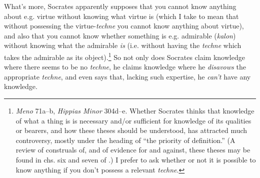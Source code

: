 ﻿\documentclass[11pt]{amsart}
\begin{document}
What's more, Socrates apparently supposes that you cannot know anything about e.g. virtue without knowing what virtue is (which I take to mean that without possessing the virtue-\emph{techne} you cannot know anything about virtue), and also that you cannot know whether something is e.g. admirable (\emph{kalon}) without knowing what the admirable \emph{is} (i.e. without having the \emph{techne} which takes the admirable as its object).\footnote{\emph{Meno} 71a--b, \emph{Hippias Minor} 304d--e. Whether Socrates thinks that knowledge of what a thing is is necessary and/or sufficient for knowledge of its qualities or bearers, and how these theses should be understood, has attracted much controversy, mostly under the heading of ``the priority of definition.'' (A review of construals of, and of evidence for and against, these theses may be found in chs. six and seven of \citet{benson2000swm}.) I prefer to ask whether or not it is possible to know anything if you don't possess a relevant \emph{techne}.} So not only does Socrates claim knowledge where there seems to be no \emph{techne}, he claims knowledge where he \emph{disavows} the appropriate \emph{techne}, and even says that, lacking such expertise, he \emph{can't} have any knowledge.








\end{document}
